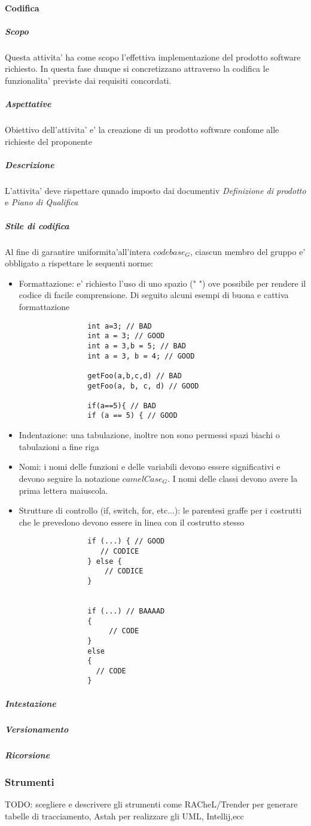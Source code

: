 		\paragraph{Codifica}
			\subparagraph{Scopo}
			Questa attivita' ha come scopo l'effettiva implementazione del prodotto software richiesto. In questa fase dunque si concretizzano attraverso la codifica le funzionalita' previste dai requisiti concordati.
			\subparagraph{Aspettative}
			Obiettivo dell'attivita' e' la creazione di un prodotto software confome alle richieste del proponente
			\subparagraph{Descrizione}
			L'attivita' deve rispettare qunado imposto dai documentiv \textit{Definizione di prodotto} e \textit{Piano di Qualifica}
			\subparagraph{Stile di codifica}
			Al fine di garantire uniformita'all'intera $codebase_G$, ciascun membro del gruppo e' obbligato a rispettare le sequenti norme:
			\begin{itemize}
			\item Formattazione: e' richiesto l'uso di uno spazio (" ") ove possibile per rendere il codice di facile comprensione.
			Di seguito alcuni  esempi di buona e cattiva formattazione
			\begin{lstlisting}
				int a=3; // BAD
				int a = 3; // GOOD
				int a = 3,b = 5; // BAD
				int a = 3, b = 4; // GOOD

				getFoo(a,b,c,d) // BAD
				getFoo(a, b, c, d) // GOOD

				if(a==5){ // BAD
				if (a == 5) { // GOOD
			\end{lstlisting}
			
			\item Indentazione: una tabulazione, inoltre non sono permessi spazi biachi o tabulazioni a fine riga
			
			\item Nomi: i nomi delle funzioni e delle variabili devono essere significativi e devono seguire la notazione $camelCase_G$. I nomi delle classi devono avere la prima lettera maiuscola.
			
			\item Strutture di controllo (if, switch, for, etc...): le parentesi graffe per i costrutti che le prevedono devono essere in linea con il costrutto stesso
			\begin{lstlisting}
				if (...) { // GOOD
 				   // CODICE
				} else {
				    // CODICE
				}
	

				if (...) // BAAAAD
				{
					 // CODE
				}
				else 
				{
				  // CODE
				}
			\end{lstlisting}
			\end{itemize}
			\subparagraph{Intestazione}
			\subparagraph{Versionamento}
			\subparagraph{Ricorsione}
	\subsubsection{Strumenti}
	TODO: scegliere e descrivere gli strumenti come RACheL/Trender  per generare tabelle di tracciamento, Astah per realizzare gli UML, Intellij,ecc

			
			
